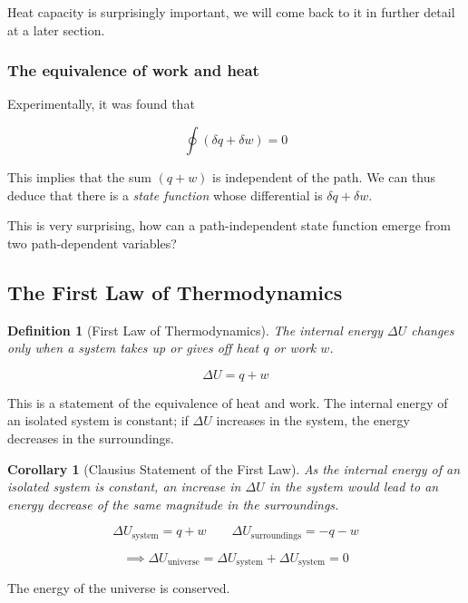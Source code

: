 \documentclass{article}
\numberwithin{theorem}{section}
\newtheorem{corollary}{Corollary}
\numberwithin{corollary}{section}
\numberwithin{postulate}{section}
\numberwithin{lemma}{section}
\newtheorem{definition}{Definition}
\numberwithin{definition}{section}
\begin{document}
Heat capacity is surprisingly important, we will come back to it in further
detail at a later section.

\subsubsection{The equivalence of work and heat}

Experimentally, it was found that

\begin{equation*}
  \oint (\delta q + \delta w) = 0
\end{equation*}

This implies that the sum $(q + w)$ is independent of the path. We
can thus deduce that there is a \textit{state function} whose differential is
$\delta q + \delta w$.

This is very surprising, how can a path-independent state function emerge from
two path-dependent variables?

\subsection{The First Law of Thermodynamics}

\begin{definition}[First Law of Thermodynamics]
The internal energy $\Delta U$ changes only when a system takes up or gives off
heat $q$ or work $w$.

  \begin{equation}
    \Delta U = q + w
  \end{equation}
\end{definition}

This is a statement of the equivalence of heat and work. The internal energy of
an isolated system is constant; if $\Delta U$ increases in the system, the
energy decreases in the surroundings.

\begin{corollary}[Clausius Statement of the First Law]
  As the internal energy of an isolated system is constant, an increase in
  $\Delta U$ in the system would lead to an energy decrease of the same
  magnitude in the surroundings.

  \begin{equation*}
    \Delta U_\mathrm{system} = q + w \qquad \Delta U_\mathrm{surroundings} = - q - w
  \end{equation*}

  \begin{equation}
    \implies \Delta U_\mathrm{universe} = \Delta U_\mathrm{system} + \Delta
    U_\mathrm{system} = 0
  \end{equation}

\end{corollary}
The energy of the universe is conserved.
\end{document}

